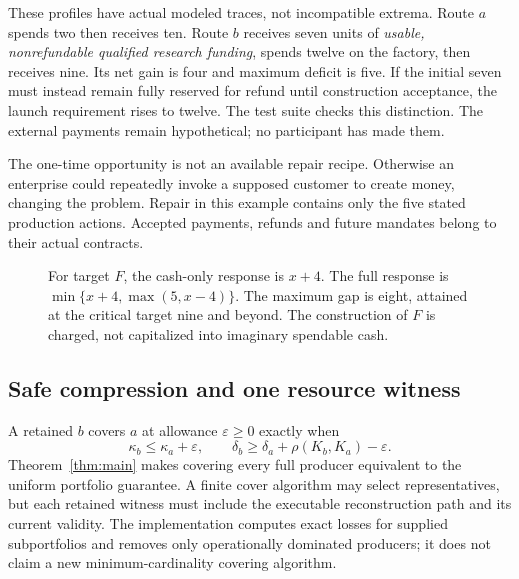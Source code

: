 \documentclass[11pt,letterpaper]{article}
\theoremstyle{definition}\newtheorem{definition}[theorem]{Definition}
\theoremstyle{remark}\newtheorem{remark}[theorem]{Remark}
\begin{document}
These profiles have actual modeled traces, not incompatible extrema. Route $a$ spends two then receives ten. Route $b$ receives seven units of \emph{usable, nonrefundable qualified research funding}, spends twelve on the factory, then receives nine. Its net gain is four and maximum deficit is five. If the initial seven must instead remain fully reserved for refund until construction acceptance, the launch requirement rises to twelve. The test suite checks this distinction. The external payments remain hypothetical; no participant has made them.

The one-time opportunity is not an available repair recipe. Otherwise an enterprise could repeatedly invoke a supposed customer to create money, changing the problem. Repair in this example contains only the five stated production actions. Accepted payments, refunds and future mandates belong to their actual contracts.

\begin{figure}[htbp]\centering
{}
\caption{For target $F$, the cash-only response is $x+4$. The full response is $\min\{x+4,\max(5,x-4)\}$. The maximum gap is eight, attained at the critical target nine and beyond. The construction of $F$ is charged, not capitalized into imaginary spendable cash.}
\label{fig:cash}
\end{figure}

\subsection{Safe compression and one resource witness}
A retained $b$ covers $a$ at allowance $\varepsilon\ge0$ exactly when
\begin{equation}
 \kappa_b\le\kappa_a+\varepsilon,\qquad
 \delta_b\ge\delta_a+\rho(K_b,K_a)-\varepsilon.
 \label{eq:cover}
\end{equation}
Theorem~\ref{thm:main} makes covering every full producer equivalent to the uniform portfolio guarantee. A finite cover algorithm may select representatives, but each retained witness must include the executable reconstruction path and its current validity. The implementation computes exact losses for supplied subportfolios and removes only operationally dominated producers; it does not claim a new minimum-cardinality covering algorithm.
\end{document}
